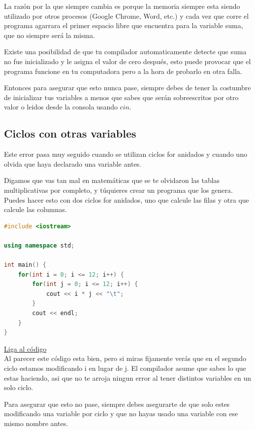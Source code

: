 \documentclass{article}
\begin{document}
La razón por la que siempre cambia es porque la memoria siempre esta siendo utilizado por otros procesos (Google Chrome, Word, etc.) y cada vez que corre el programa agarrara el primer espacio libre que encuentra para la variable suma, que no siempre será la misma.

Existe una posibilidad de que tu compilador automaticamente detecte que suma no fue inicializado y le asigna el valor de cero después, esto puede provocar que el programa funcione en tu computadora pero a la hora de probarlo en otra falla.

Entonces para asegurar que esto nunca pase, siempre debes de tener la costumbre de inicializar tus variables a menos que sabes que serán sobreescritos por otro valor o leidos desde la consola usando $cin$.

\subsection{Ciclos con otras variables}
Este error pasa muy seguido cuando se utilizan ciclos for anidados y cuando uno olvida que haya declarado una variable antes.

Digamos que vas tan mal en matemáticas que se te olvidaron las tablas multiplicativas por completo, y túquieres crear un programa que los genera. Puedes hacer esto con dos ciclos for anidados, uno que calcule las filas y otra que calcule las columnas.

\begin{lstlisting}[language=C++, caption=Ciclos con otras variables]
#include <iostream>

using namespace std;

int main() {
    for(int i = 0; i <= 12; i++) {
        for(int j = 0; i <= 12; i++) {
            cout << i * j << "\t";
        }
        cout << endl;
    }
}
\end{lstlisting}
\href{https://repl.it/@Jamesscn/Tablas-de-Falsedad}{Liga al código}\\

Al parecer este código esta bien, pero si miras fijamente verás que en el segundo ciclo estamos modificando i en lugar de j. El compilador asume que sabes lo que estas haciendo, asi que no te arroja ningun error al tener distintos variables en un solo ciclo.

Para asegurar que esto no pase, siempre debes asegurarte de que solo estes modificando una variable por ciclo y que no hayas usado una variable con ese mismo nombre antes.
\end{document}
